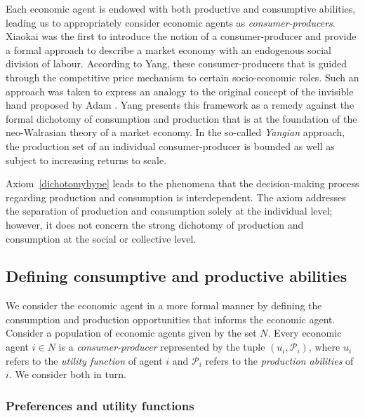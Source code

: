 Each economic agent is endowed with both productive and consumptive abilities, leading us to appropriately consider economic agents as \emph{consumer-producers}. Xiaokai \citet{Yang1988, Yang2001} was the first to introduce the notion of a consumer-producer and provide a formal approach to describe a market economy with an endogenous social division of labour. According to Yang, these consumer-producers that is guided through the competitive price mechanism to certain socio-economic roles. Such an approach was taken to express an analogy to the original concept of the invisible hand proposed by Adam \citet{Smith1776}. Yang presents this framework as a remedy against the formal dichotomy of consumption and production that is at the foundation of the neo-Walrasian theory of a market economy. In the so-called \emph{Yangian} approach, the production set of an individual consumer-producer is bounded as well as subject to increasing returns to scale.

Axiom~\ref{dichotomyhype} leads to the phenomena that the decision-making process regarding production and consumption is interdependent. The axiom addresses the separation of production and consumption solely at the individual level; however, it does not concern the strong dichotomy of production and consumption at the social or collective level.

\subsection{Defining consumptive and productive abilities}

We consider the economic agent in a more formal manner by defining the consumption and production opportunities that informs the economic agent. Consider a population of economic agents given by the set $N$. Every economic agent $i \in N$ is a \emph{consumer-producer} represented by the tuple $\left( u_{i}, \mathcal{P}_{i} \right)$, where $u_{i}$ refers to the \emph{utility function} of agent $i$ and $\mathcal{P}_{i}$ refers to the \emph{production abilities} of $i$. We consider both in turn.

\subsubsection{Preferences and utility functions}

